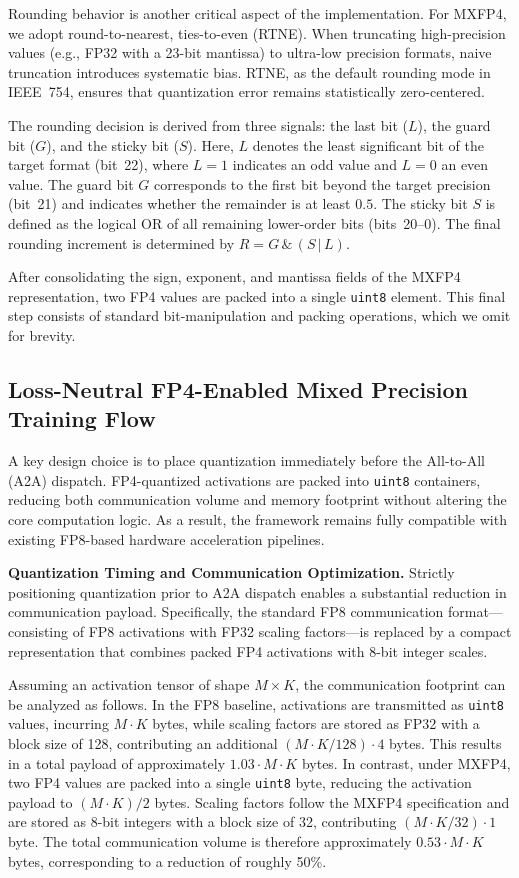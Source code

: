 Rounding behavior is another critical aspect of the implementation. For MXFP4, we adopt round-to-nearest, ties-to-even (RTNE). When truncating high-precision values (e.g., FP32 with a 23-bit mantissa) to ultra-low precision formats, naive truncation introduces systematic bias. RTNE, as the default rounding mode in IEEE~754, ensures that quantization error remains statistically zero-centered.

The rounding decision is derived from three signals: the last bit ($L$), the guard bit ($G$), and the sticky bit ($S$). Here, $L$ denotes the least significant bit of the target format (bit~22), where $L=1$ indicates an odd value and $L=0$ an even value. The guard bit $G$ corresponds to the first bit beyond the target precision (bit~21) and indicates whether the remainder is at least $0.5$. The sticky bit $S$ is defined as the logical OR of all remaining lower-order bits (bits~20--0). The final rounding increment is determined by
$R = G \,\&\, (S \,|\, L)$.

After consolidating the sign, exponent, and mantissa fields of the MXFP4 representation, two FP4 values are packed into a single \texttt{uint8} element. This final step consists of standard bit-manipulation and packing operations, which we omit for brevity.

\subsection{Loss-Neutral FP4-Enabled Mixed Precision Training Flow}

A key design choice is to place quantization immediately before the All-to-All (A2A) dispatch. FP4-quantized activations are packed into \texttt{uint8} containers, reducing both communication volume and memory footprint without altering the core computation logic. As a result, the framework remains fully compatible with existing FP8-based hardware acceleration pipelines.

\textbf{Quantization Timing and Communication Optimization.}
Strictly positioning quantization prior to A2A dispatch enables a substantial reduction in communication payload. Specifically, the standard FP8 communication format—consisting of FP8 activations with FP32 scaling factors—is replaced by a compact representation that combines packed FP4 activations with 8-bit integer scales.

Assuming an activation tensor of shape $M \times K$, the communication footprint can be analyzed as follows. In the FP8 baseline, activations are transmitted as \texttt{uint8} values, incurring $M \cdot K$ bytes, while scaling factors are stored as FP32 with a block size of 128, contributing an additional $(M \cdot K / 128) \cdot 4$ bytes. This results in a total payload of approximately $1.03 \cdot M \cdot K$ bytes. In contrast, under MXFP4, two FP4 values are packed into a single \texttt{uint8} byte, reducing the activation payload to $(M \cdot K)/2$ bytes. Scaling factors follow the MXFP4 specification and are stored as 8-bit integers with a block size of 32, contributing $(M \cdot K / 32) \cdot 1$ byte. The total communication volume is therefore approximately $0.53 \cdot M \cdot K$ bytes, corresponding to a reduction of roughly 50\%.

